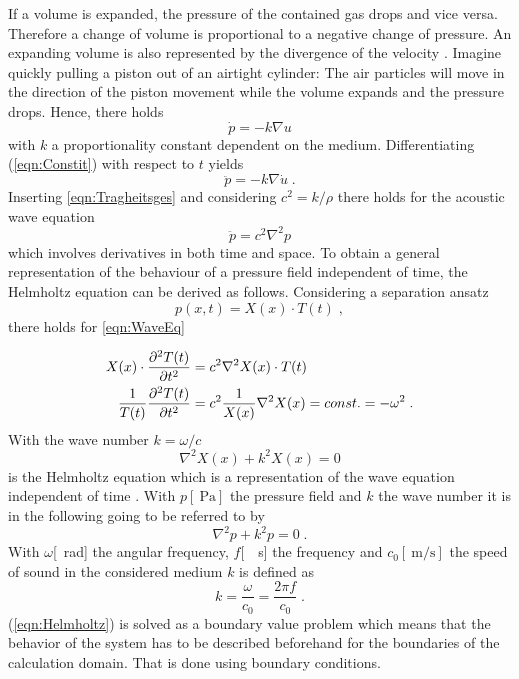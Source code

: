 \documentclass[%
  a4paper,oneside,%
  11pt,%
  smallchapters,
  style=printdev,
  extramargin,
  green,%
  rgb, <cmyk>
  ]{tubsbook}
\begin{document}
If a volume is expanded, the pressure of the contained gas drops and vice versa. Therefore a change of volume is proportional to a negative change of pressure. An expanding volume is also represented by the divergence of the velocity \cite{larson2013}. Imagine quickly pulling a piston out of an airtight cylinder: The air particles will move in the direction of the piston movement while the volume expands and the pressure drops. Hence, there holds
\begin{equation}
\dot{p} = -k \nabla u
\label{eqn:Constit}
\end{equation}
with $k$ a proportionality constant dependent on the medium.
Differentiating (\ref{eqn:Constit}) with respect to $t$ yields 
\begin{equation}
\ddot{p} = -k \nabla \dot{u} \;.
\end{equation}
Inserting \ref{eqn:Tragheitsges} and considering $c^2 = k/\rho$ there holds for the acoustic wave equation
\begin{equation}
\ddot{p} = c^2 \nabla^2 p 
\label{eqn:WaveEq}
\end{equation}
which involves derivatives in both time and space. To obtain a general representation of the behaviour of a pressure field independent of time, the Helmholtz equation can be derived as follows.
Considering a separation ansatz \cite{westermann2015}
\begin{equation}
p(x,t) = X(x) \cdot T(t) \; ,
\end{equation}
there holds for \ref{eqn:WaveEq}

\begin{align}
X(x) \cdot \pdv[2]{T(t)}{t} &= c^2 \nabla^2 X(x) \cdot T(t)\\
\frac{1}{T(t)} \pdv[2]{T(t)}{t} &= c^2 \frac{1}{X(x)} \nabla^2 X(x) = const. = - \omega^2 \; .
\end{align}
With the wave number $k = \omega / c$ 
\begin{equation}
\nabla^2 X(x) + k^2 X(x) = 0
\end{equation}
is the Helmholtz equation which is a representation of the wave equation independent of time \cite[p. 1083 ff.]{arens2015}.
%
With $p [\SI{}{\pascal}]$ the pressure field and $k$ the wave number it is in the following going to be referred to by
\begin{equation}
\nabla^2 p + k^2 p = 0 \;.
\label{eqn:Helmholtz}
\end{equation}
With $\omega$[\SI{}{\radian}] the angular frequency, $f$[\SI{}{\per\s}] the frequency and $c_0[\SI{}{\metre\per\s}]$ the speed of sound in the considered medium $k$ is defined as
\begin{equation}
k = \frac{\omega}{c_0} = \frac{2 \pi f}{c_0} \;.
\end{equation}
(\ref{eqn:Helmholtz}) is solved as a boundary value problem which means that the behavior of the system has to be described beforehand for the boundaries of the calculation domain. That is done using boundary conditions.
\end{document}
